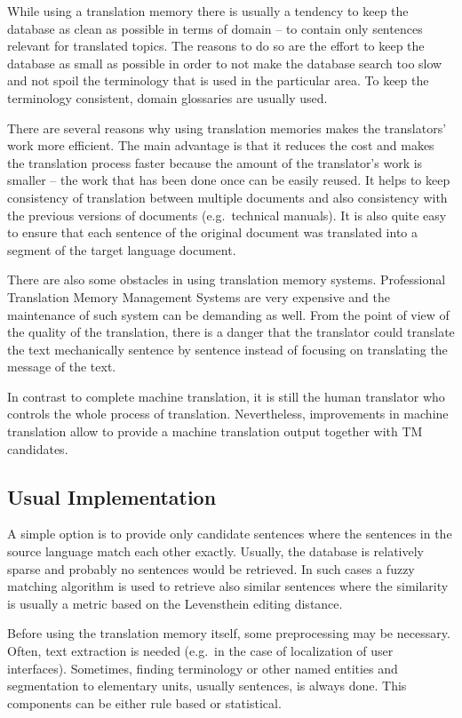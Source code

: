 While using a translation memory there is usually a tendency to keep the database as clean as possible in terms of domain -- to contain only sentences relevant for translated topics. The reasons to do so are the effort to keep the database as small as possible in order to not make the database search too slow and not spoil the terminology that is used in the particular area. To keep the terminology consistent, domain glossaries are usually used.

There are several reasons why using translation memories makes the translators' work more efficient. The main advantage is that it reduces the cost and makes the translation process faster because the amount of the translator's work is smaller -- the work that has been done once can be easily reused. It helps to keep consistency of translation between multiple documents and also consistency with the previous versions of documents (e.g.\ technical manuals). It is also quite easy to ensure that each sentence of the original document was translated into a segment of the target language document.

There are also some obstacles in using translation memory systems. Professional Translation Memory Management Systems are very expensive and the maintenance of such system can be demanding as well. From the point of view of the quality of the translation, there is a danger that the translator could translate the text mechanically sentence by sentence instead of focusing on translating the message of the text.

In contrast to complete machine translation, it is still the human translator who controls the whole process of translation. Nevertheless, improvements in machine translation allow to provide a machine translation output together with TM candidates.

\subsection{Usual Implementation}

A simple option is to provide only candidate sentences where the sentences in the source language match  each other exactly. Usually, the database is relatively sparse and probably no sentences would be retrieved. In such cases a fuzzy matching algorithm is used to retrieve also similar sentences where the similarity is usually a metric based on the Levensthein editing distance.

Before using the translation memory itself, some preprocessing may be necessary. Often, text extraction is needed (e.g.\ in the case of localization of user interfaces). Sometimes, finding terminology or other named entities and segmentation to elementary units, usually sentences, is always done. This components can be either rule based or statistical.

